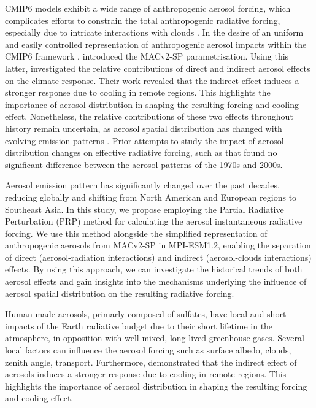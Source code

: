 \documentclass[draft]{agujournal2019}
\begin{document}
      CMIP6 models exhibit a wide range of anthropogenic aerosol forcing, which complicates efforts to constrain the total anthropogenic radiative forcing, especially due to intricate interactions with clouds \cite{Bellouin_2020}.
      In the desire of an uniform and easily controlled representation of anthropogenic aerosol impacts within the CMIP6 framework \cite{Eyring_2016,Pincus_2016},  introduced the MACv2-SP parametrisation. Using this latter,  investigated the relative contributions of direct and indirect aerosol effects on the climate response. Their work revealed that the indirect effect induces a stronger response due to cooling in remote regions. This highlights the importance of aerosol distribution in shaping the resulting forcing and cooling effect.
      Nonetheless, the relative contributions of these two effects throughout history remain uncertain, as aerosol spatial distribution has changed with evolving emission patterns \cite{Stevens_2015}. Prior attempts to study the impact of aerosol distribution changes on effective radiative forcing, such as  that found no significant difference between the aerosol patterns of the 1970s and 2000s.

      Aerosol emission pattern has significantly changed over the past decades, reducing globally and shifting from North American and European regions to Southeast Asia. In this study, we propose employing the Partial Radiative Perturbation (PRP) method \cite{Wetherald_1988,Colman_1997,Klocke_2013} for calculating the aerosol instantaneous radiative forcing. We use this method alongside the simplified representation of anthropogenic aerosols from MACv2-SP in MPI-ESM1.2, enabling the separation of direct (aerosol-radiation interactions) and indirect (aerosol-clouds interactions) effects. By using this approach, we can investigate the historical trends of both aerosol effects and gain insights into the mechanisms underlying the influence of aerosol spatial distribution on the resulting radiative forcing.

      Human-made aerosols, primarly composed of sulfates, have local and short impacts of the Earth radiative budget due to their short lifetime in the atmosphere, in opposition with well-mixed, long-lived greenhouse gases. 
      Several local factors can influence the aerosol forcing such as surface albedo, clouds, zenith angle, transport. Furthermore,  demonstrated that the indirect effect of aerosols induces a stronger response due to cooling in remote regions. This highlights the importance of aerosol distribution in shaping the resulting forcing and cooling effect.
\end{document}
